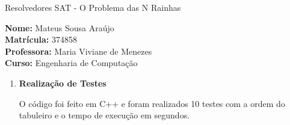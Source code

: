 \documentclass[11pt,a4paper]{article}
\begin{document}
	\begin{center}
		\Large Resolvedores SAT - O Problema das N Rainhas  
	\end{center}

\begin{flushleft}
\textbf{Nome:} Mateus Sousa Araújo \\
\textbf{Matrícula:} 374858 \\
\textbf{Professora:} Maria Viviane de Menezes \\
\textbf{Curso:} Engenharia de Computação \\
\end{flushleft}

\begin{enumerate}

\item \textbf{Realização de Testes}

O código foi feito em C++ e foram realizados 10 testes com a ordem do tabuleiro e o tempo de execução em segundos.

\begin{table}[h]
 \centering
 {\renewcommand\arraystretch{1.25}
 
}
\end{table}
\end{enumerate}
\end{document}
